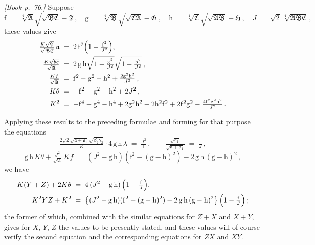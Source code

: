 \documentclass[11pt]{article}
\providecommand{\fA}{\mathfrak{A}}
\providecommand{\fB}{\mathfrak{B}}
\providecommand{\fC}{\mathfrak{C}}
\providecommand{\fF}{\mathfrak{F}}
\providecommand{\fG}{\mathfrak{G}}
\providecommand{\fH}{\mathfrak{H}}
\begin{document}
\noindent\emph{[Book p.~76.]} Suppose
\[
\mathrm{f} \;=\; \sqrt[4]{\fA}\sqrt{\sqrt{\fB\fC} - \fF}\,,\quad \mathrm{g} \;=\; \sqrt[4]{\fB}\sqrt{\sqrt{\fC\fA} - \fG}\,,\quad \mathrm{h} \;=\; \sqrt[4]{\fC}\sqrt{\sqrt{\fA\fB} - \fH}\,,\quad J \;=\; \sqrt{2}\,\sqrt[4]{\fA\fB\fC}\,,
\]
these values give
\begin{align*}
\tfrac{K\sqrt{\fA}}{\sqrt{\fB\fC}}\,\mathfrak{a} &\;=\; 2\,\mathrm{f}^{2}\Bigl(1 - \tfrac{\mathrm{f}^{2}}{J^{2}}\Bigr),\\
\tfrac{K\sqrt{bc}}{\sqrt{\fA}}        &\;=\; 2\,\mathrm{g}\,\mathrm{h}\sqrt{1 - \tfrac{\mathrm{g}^{2}}{J^{2}}}\sqrt{1 - \tfrac{\mathrm{h}^{2}}{J^{2}}}\,,\\
\tfrac{Kf}{\sqrt{\fA}}                &\;=\; \mathrm{f}^{2} - \mathrm{g}^{2} - \mathrm{h}^{2} + \tfrac{2\mathrm{g}^{2}\mathrm{h}^{2}}{J^{2}}\,,\\
K\theta                               &\;=\; -\mathrm{f}^{2} - \mathrm{g}^{2} - \mathrm{h}^{2} + 2J^{2}\,,\\
K^{2}                                  &\;=\; -\mathrm{f}^{4} - \mathrm{g}^{4} - \mathrm{h}^{4} + 2\mathrm{g}^{2}\mathrm{h}^{2} + 2\mathrm{h}^{2}\mathrm{f}^{2} + 2\mathrm{f}^{2}\mathrm{g}^{2} - \tfrac{4\mathrm{f}^{2}\mathrm{g}^{2}\mathrm{h}^{2}}{J^{2}}\,.
\end{align*}

Applying these results to the preceding formulae and forming for that purpose the equations
\[
\tfrac{2\sqrt{2}\sqrt{\mathfrak{a} + \mathfrak{a}_{1}}\sqrt{\beta_{2}\gamma_{2}}}{K} \cdot 4\,\mathrm{g}\,\mathrm{h}\,\lambda \;=\; \tfrac{J^{2}}{\mathrm{f}}\,,\qquad \tfrac{\sqrt{\mathfrak{a}_{1}}}{\sqrt{\mathfrak{a} + \mathfrak{a}_{1}}} \;=\; \tfrac{\mathrm{f}}{J}\,,
\]
\[
\mathrm{g}\,\mathrm{h}\,K\theta + \tfrac{J^{2}}{\sqrt{\fA}}\,Kf \;=\; (J^{2} - \mathrm{g}\,\mathrm{h})(\mathrm{f}^{2} - (\mathrm{g} - \mathrm{h})^{2}) - 2\,\mathrm{g}\,\mathrm{h}\,(\mathrm{g} - \mathrm{h})^{2}\,,
\]
we have
\begin{align*}
K(Y + Z) + 2K\theta &\;=\; 4\,(J^{2} - \mathrm{g}\,\mathrm{h})\,\Bigl(1 - \tfrac{\mathrm{f}}{J}\Bigr),\\
K^{2}YZ + K^{2}       &\;=\; \bigl\{(J^{2} - \mathrm{g}\,\mathrm{h})(\mathrm{f}^{2} - (\mathrm{g} - \mathrm{h})^{2}) - 2\,\mathrm{g}\,\mathrm{h}\,(\mathrm{g} - \mathrm{h})^{2}\bigr\}\,\Bigl(1 - \tfrac{\mathrm{f}}{J}\Bigr)\,;
\end{align*}
the former of which, combined with the similar equations for $Z + X$ and $X + Y$, gives for $X$, $Y$, $Z$ the values to be presently stated, and these values will of course verify the second equation and the corresponding equations for $ZX$ and $XY$.
\end{document}
